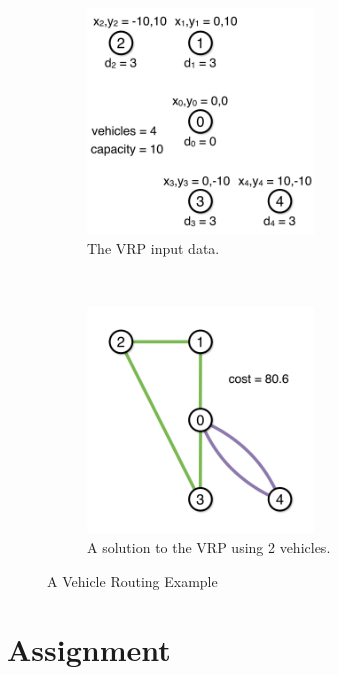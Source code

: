 \documentclass[11pt]{article}
\begin{document}
\begin{figure}[h]
        \centering
        \begin{subfigure}[b]{8.0cm}%
                \centering
                \includegraphics[width=6cm]{figures/vrp_1.pdf}
                \caption{The VRP input data.}
                \label{fig:vrp:input}
        \end{subfigure}%
        ~ %
        \hfill
        \begin{subfigure}[b]{8.0cm}
                \centering
                \includegraphics[width=6cm]{figures/vrp_2.pdf}
                \caption{A solution to the VRP using 2 vehicles.}
                \label{fig:vrp:sol}
        \end{subfigure}
        \caption{A Vehicle Routing Example}\label{fig:vrp}
\end{figure}

\section{Assignment}
\end{document}
